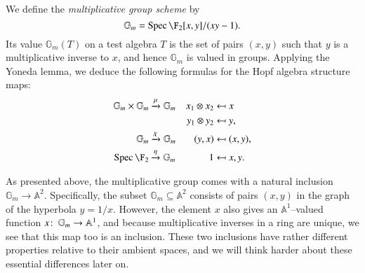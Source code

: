 \begin{example}
We define the \textit{multiplicative group scheme} by \[\mathbb G_m = \Spec \F_2[x, y] / (xy - 1).\]  Its value $\mathbb G_m(T)$ on a test algebra $T$ is the set of pairs $(x, y)$ such that $y$ is a multiplicative inverse to $x$, and hence $\mathbb G_m$ is valued in groups.  Applying the Yoneda lemma, we deduce the following formulas for the Hopf algebra structure maps:
\begin{align*}
\mathbb G_m \times \mathbb G_m & \xrightarrow{\mu} \mathbb G_m & x_1 \otimes x_2 & \mapsfrom x \\
& & y_1 \otimes y_2 & \mapsfrom y, \\
\mathbb G_m & \xrightarrow{\chi} \mathbb G_m & (y, x) & \mapsfrom (x, y), \\
\Spec \F_2 & \xrightarrow{\eta} \mathbb G_m & 1 & \mapsfrom x, y.
\end{align*}
\end{example}

\begin{remark}
As presented above, the multiplicative group comes with a natural inclusion $\mathbb G_m \to \mathbb A^2$.  Specifically, the subset $\mathbb G_m \subseteq \mathbb A^2$ consists of pairs $(x, y)$ in the graph of the hyperbola $y = 1/x$.  However, the element $x$ also gives an $\mathbb A^1$--valued function $x\colon\thinspace \mathbb G_m \to \mathbb A^1$, and because multiplicative inverses in a ring are unique, we see that this map too is an inclusion.  These two inclusions have rather different properties relative to their ambient spaces, and we will think harder about these essential differences later on.
\end{remark}

